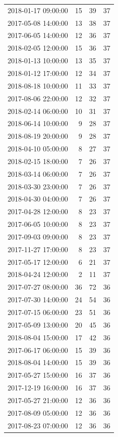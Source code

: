 \begin{tabular}{lrrr}
2018-01-17 09:00:00 & 15 & 39 & 37 \\
2017-05-08 14:00:00 & 13 & 38 & 37 \\
2017-06-05 14:00:00 & 12 & 36 & 37 \\
2018-02-05 12:00:00 & 15 & 36 & 37 \\
2018-01-13 10:00:00 & 13 & 35 & 37 \\
2018-01-12 17:00:00 & 12 & 34 & 37 \\
2018-08-18 10:00:00 & 11 & 33 & 37 \\
2017-08-06 22:00:00 & 12 & 32 & 37 \\
2018-02-14 06:00:00 & 10 & 31 & 37 \\
2018-06-14 10:00:00 & 9 & 28 & 37 \\
2018-08-19 20:00:00 & 9 & 28 & 37 \\
2018-04-10 05:00:00 & 8 & 27 & 37 \\
2018-02-15 18:00:00 & 7 & 26 & 37 \\
2018-03-14 06:00:00 & 7 & 26 & 37 \\
2018-03-30 23:00:00 & 7 & 26 & 37 \\
2018-04-30 04:00:00 & 7 & 26 & 37 \\
2017-04-28 12:00:00 & 8 & 23 & 37 \\
2017-06-05 10:00:00 & 8 & 23 & 37 \\
2017-09-03 09:00:00 & 8 & 23 & 37 \\
2017-11-27 17:00:00 & 8 & 23 & 37 \\
2017-05-17 12:00:00 & 6 & 21 & 37 \\
2018-04-24 12:00:00 & 2 & 11 & 37 \\
2017-07-27 08:00:00 & 36 & 72 & 36 \\
2017-07-30 14:00:00 & 24 & 54 & 36 \\
2017-07-15 06:00:00 & 23 & 51 & 36 \\
2017-05-09 13:00:00 & 20 & 45 & 36 \\
2018-08-04 15:00:00 & 17 & 42 & 36 \\
2017-06-17 06:00:00 & 15 & 39 & 36 \\
2018-08-04 14:00:00 & 15 & 39 & 36 \\
2017-05-27 15:00:00 & 16 & 37 & 36 \\
2017-12-19 16:00:00 & 16 & 37 & 36 \\
2017-05-27 21:00:00 & 12 & 36 & 36 \\
2017-08-09 05:00:00 & 12 & 36 & 36 \\
2017-08-23 07:00:00 & 12 & 36 & 36 \\

\end{tabular}
